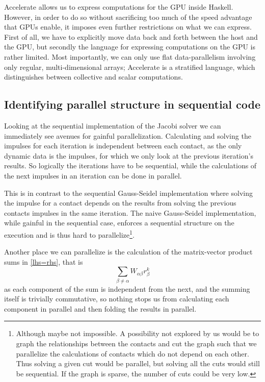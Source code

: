\documentclass[runningheads,a4paper]{llncs}
\begin{document}
Accelerate allows us to express computations for the GPU inside
Haskell. However, in order to do so without sacrificing too much of the speed
advantage that GPUs enable, it imposes even further restrictions on what we can
express. First of all, we have to explicitly move data back and forth between
the host and the GPU, but secondly the language for expressing computations on
the GPU is rather limited. Most importantly, we can only use flat
data-parallelism involving only regular, multi-dimensional arrays; Accelerate
is a stratified language, which distinguishes between collective and scalar
computations.

\subsection{Identifying parallel structure in sequential code\label{identpara}}
Looking at the sequential implementation
of the Jacobi solver
we can immediately see avenues for gainful parallelization.
Calculating and solving the impulses
for each iteration is independent between each contact,
as the only dynamic data is the impulses,
for which we only look at the previous iteration's results.
So logically the iterations have to be sequential,
while the calculations of the next impulses in an iteration
can be done in parallel.

This is in contrast to the sequential Gauss-Seidel implementation
where solving the impulse for a contact depends
on the results from solving the previous contacts impulses
in the same iteration.
The naive Gauss-Seidel implementation,
while gainful in the sequential case,
enforces a sequential structure on the execution
and is thus hard to parallelize\footnote{
  Although maybe not impossible. A possibility not explored by us
  would be to graph the relationships between the contacts
  and cut the graph such that we parallelize the calculations
  of contacts which do not depend on each other.
  Thus solving a given cut would be parallel,
  but solving all the cuts would still be sequential.
  If the graph is sparse, the number of cuts could be very low.}.

Another place we can parallelize is the calculation
of the matrix-vector product sums in \eqref{lhs=rhs},
that is \[\sum\limits_{\beta \neq \alpha} W_{\alpha\beta} r_\beta^k\]
as each component of the sum is independent from the next,
and the summing itself is trivially commutative,
so nothing stops us from calculating each component in parallel
and then folding the results in parallel.
\end{document}

